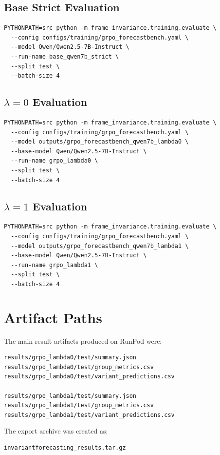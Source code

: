 \documentclass[11pt]{article}
\begin{document}
\subsection*{Base Strict Evaluation}

\begin{verbatim}
PYTHONPATH=src python -m frame_invariance.training.evaluate \
  --config configs/training/grpo_forecastbench.yaml \
  --model Qwen/Qwen2.5-7B-Instruct \
  --run-name base_qwen7b_strict \
  --split test \
  --batch-size 4
\end{verbatim}

\subsection*{$\lambda=0$ Evaluation}

\begin{verbatim}
PYTHONPATH=src python -m frame_invariance.training.evaluate \
  --config configs/training/grpo_forecastbench.yaml \
  --model outputs/grpo_forecastbench_qwen7b_lambda0 \
  --base-model Qwen/Qwen2.5-7B-Instruct \
  --run-name grpo_lambda0 \
  --split test \
  --batch-size 4
\end{verbatim}

\subsection*{$\lambda=1$ Evaluation}

\begin{verbatim}
PYTHONPATH=src python -m frame_invariance.training.evaluate \
  --config configs/training/grpo_forecastbench.yaml \
  --model outputs/grpo_forecastbench_qwen7b_lambda1 \
  --base-model Qwen/Qwen2.5-7B-Instruct \
  --run-name grpo_lambda1 \
  --split test \
  --batch-size 4
\end{verbatim}

\section*{Artifact Paths}

The main result artifacts produced on RunPod were:

\begin{verbatim}
results/grpo_lambda0/test/summary.json
results/grpo_lambda0/test/group_metrics.csv
results/grpo_lambda0/test/variant_predictions.csv

results/grpo_lambda1/test/summary.json
results/grpo_lambda1/test/group_metrics.csv
results/grpo_lambda1/test/variant_predictions.csv
\end{verbatim}

The export archive was created as:

\begin{verbatim}
invariantforecasting_results.tar.gz
\end{verbatim}
\end{document}
